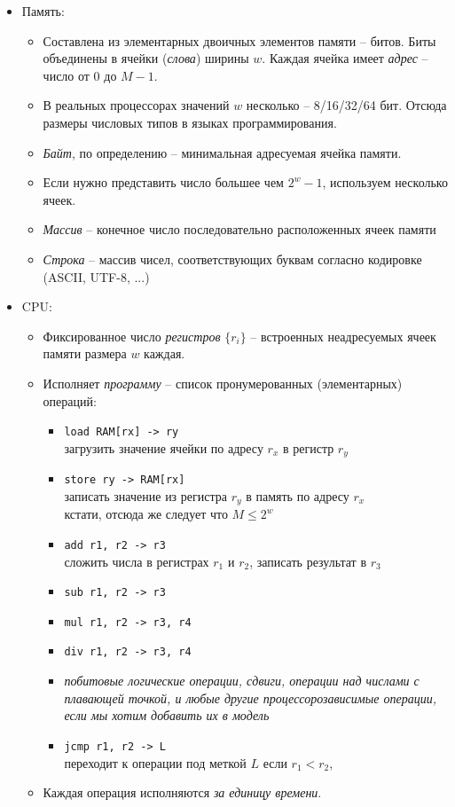 \begin{itemize}
  \item Память: 
  \begin{itemize}
    \item Составлена из элементарных двоичных элементов памяти -- битов. Биты объединены в ячейки ({\em слова}) ширины $w$. Каждая ячейка имеет {\em адрес} -- число от $0$ до $M-1$.
    \item В реальных процессорах значений $w$ несколько -- 8/16/32/64 бит. Отсюда размеры числовых типов в языках программирования.
    \item {\em Байт}, по определению -- минимальная адресуемая ячейка памяти.
    \item Если нужно представить число большее чем $2^w-1$, используем несколько ячеек.
    \item {\em Массив} -- конечное число последовательно расположенных ячеек памяти
    \item {\em Строка} -- массив чисел, соответствующих буквам согласно кодировке (ASCII, UTF-8, ...)
  \end{itemize}
  \item CPU: 
  \begin{itemize}
    \item Фиксированное число {\em регистров} $\{r_i\}$ -- встроенных неадресуемых ячеек памяти размера $w$ каждая.
    \item Исполняет {\em программу} -- список пронумерованных (элементарных) операций:
    \begin{itemize}
      \item {\tt load RAM[rx] -> ry}\\
          загрузить значение ячейки по адресу $r_x$ в регистр $r_y$
      \item {\tt store ry -> RAM[rx]}\\
            записать значение из регистра $r_y$ в память по адресу $r_x$\\
            кстати, отсюда же следует что $M \leq 2^w$
      \item {\tt add r1, r2 -> r3}\\
          сложить числа в регистрах $r_1$ и $r_2$, записать результат в $r_3$
      \item {\tt sub r1, r2 -> r3}
      \item {\tt mul r1, r2 -> r3, r4}
      \item {\tt div r1, r2 -> r3, r4}
      \item {\em побитовые логические операции, сдвиги, операции над числами с плавающей точкой, и любые другие процессорозависимые операции, если мы хотим добавить их в модель}
      \item {\tt jcmp r1, r2 -> L}\\
          переходит к операции под меткой $L$ если $r_1 < r_2$,
    \end{itemize}
    \item Каждая операция исполняются {\em за единицу времени}.
  \end{itemize}
\end{itemize}

